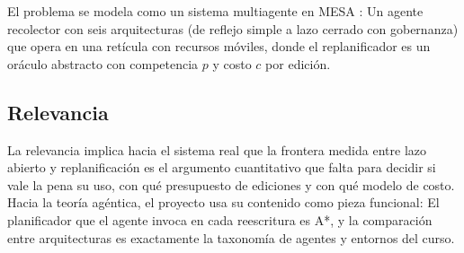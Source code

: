 \begin{quote}
  \proyPregunta
\end{quote}

El problema se modela como un sistema multiagente en MESA \parencite{kazil2020mesa}: Un
agente recolector con seis arquitecturas (de reflejo simple a lazo cerrado con
gobernanza) que opera en una retícula con recursos móviles, donde el replanificador es
un oráculo abstracto con competencia $p$ y costo $c$ por edición.

\subsection*{Relevancia}

La relevancia implica hacia el sistema real que la frontera medida entre lazo abierto y replanificación es el argumento cuantitativo que falta para decidir si vale la pena su uso, con qué presupuesto de ediciones y con qué modelo de costo. Hacia la teoría agéntica, el proyecto usa su contenido como pieza funcional: El planificador que el agente invoca en cada reescritura es A*, y la comparación entre arquitecturas es exactamente la taxonomía de agentes y entornos del curso.
